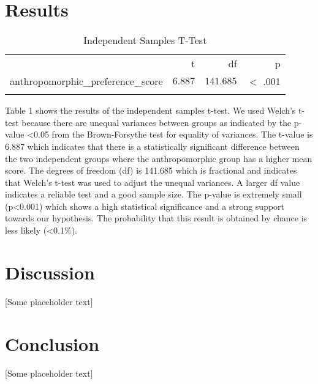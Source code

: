 \documentclass[conference]{IEEEtran}
\begin{document}
\section{Results}
\begin{table}[h]
	\centering
	\caption{Independent Samples T-Test}
	\label{tab:independentSamplesT-Test}
	{
		\begin{tabular}{lrrr}
			\toprule
			$ $ & t & df & p  \\
			\cmidrule[0.4pt]{1-4}
			anthropomorphic\_preference\_score & $6.887$ & $141.685$ & $<$ .001  \\
			\bottomrule
			\addlinespace[1ex]
			\multicolumn{4}{p{0.5\linewidth}}{\textit{Note.} Welch's t-test.} \\
		\end{tabular}
	}
\end{table}

Table 1 shows the results of the independent samples t-test. We used Welch’s t-test because there are unequal variances between groups as indicated by the p-value \textless 0.05 from the Brown-Forsythe test for equality of variances. The t-value is 6.887 which indicates that there is a statistically significant difference between the two independent groups where the anthropomorphic group has a higher mean score. The degrees of freedom (df) is 141.685 which is fractional and indicates that Welch’s t-test was used to adjust the unequal variances. A larger df value indicates a reliable test and a good sample size. The p-value is extremely small (p\textless0.001) which shows a high statistical significance and a strong support towards our hypothesis. The probability that this result is obtained by chance is less likely (\textless 0.1\%).                 

\section{Discussion}
 [Some placeholder text]

\section{Conclusion}
 [Some placeholder text]
\end{document}
